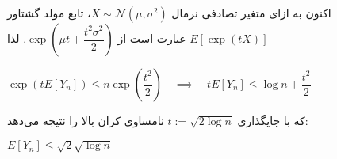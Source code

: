 \documentclass{scribe-cgenomics}
\begin{document}
\begin{حل}
اکنون به ازای متغیر تصادفی نرمال
$X \sim \mathcal{N}(\mu, \sigma^2)$،
تابع مولد گشتاور
$E[\exp(tX)]$
عبارت است از
$\exp(\mu t + \dfrac{t^2 \sigma^2}{2})$.
لذا

\begin{center}
$
\exp (tE[Y_n]) \leq n\exp(\dfrac{t^2}{2})
\quad \implies \quad
tE[Y_n] \leq \log n + \dfrac{t^2}{2}
$
\end{center}

که با جایگذاری
$t:=\sqrt{2\log n}$
نامساوی کران بالا را نتیجه می‌دهد:

\begin{center}
$
E[Y_n] \leq \sqrt{2}\sqrt{\log n}
$
\end{center}

\end{حل}


\newpage
\begin{prob}
\end{prob}
\end{document}
